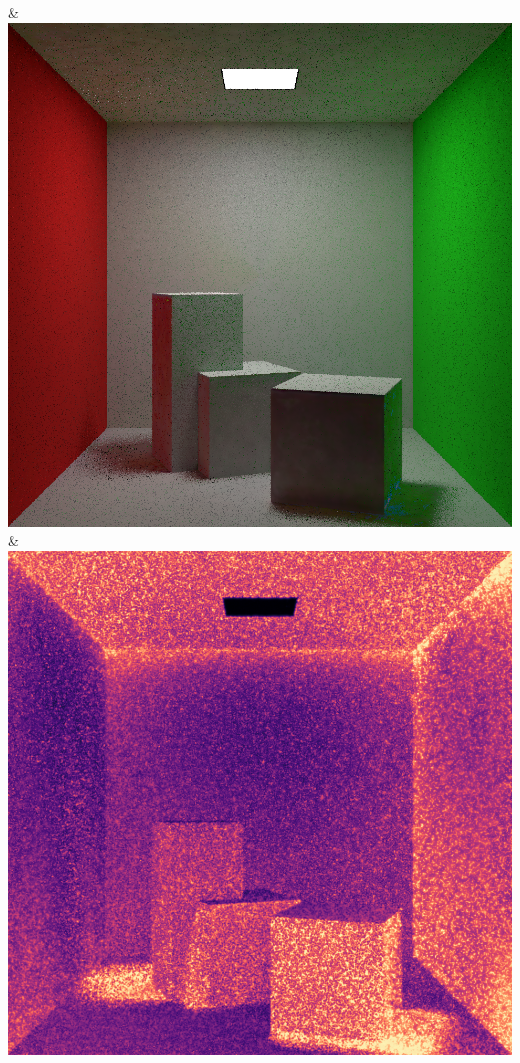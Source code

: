 & \includegraphics[width=\linewidth]{figures/py/tests/path_termination/bthk9_1spp.png}
\\
& \includegraphics[width=\linewidth]{figures/py/tests/path_termination/ref_1spp_flip.png}
